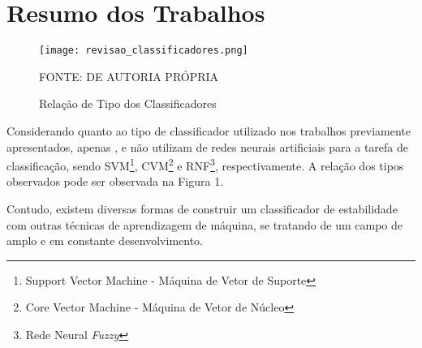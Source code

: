 \documentclass[12pt,oneside,a4paper,chapter=TITLE,section=TITLE,sumario=tradicional,english,brazil]{abntex2}
\begin{document}
\section{Resumo dos Trabalhos}
\begin{figure}[ht!]
\centering
\caption{Relação de Tipo dos Classificadores}
\par
\texttt{[image: revisao\_classificadores.png]}
\centering
\par
FONTE: DE AUTORIA PRÓPRIA
\end{figure}
Considerando quanto ao tipo de classificador utilizado nos trabalhos previamente apresentados, apenas \textcite{kalyani2011}, \textcite{Gharehpetian2009} e \textcite{amjady2004} não utilizam de redes neurais artificiais para a tarefa de classificação, sendo SVM\footnote{Support Vector Machine - Máquina de Vetor de Suporte}, CVM\footnote{Core Vector Machine - Máquina de Vetor de Núcleo}  e RNF\footnote{Rede Neural \textit{Fuzzy}}, respectivamente. A relação dos tipos observados pode ser observada na Figura 1.\par
Contudo, existem diversas formas de construir um classificador de estabilidade com outras técnicas de aprendizagem de máquina, se tratando de um campo de amplo e em constante desenvolvimento.\par
\end{document}
